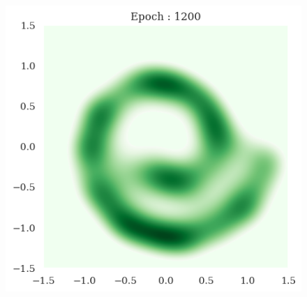 \documentclass[10pt]{article}
\begin{document}
\begin{figure}[!h]
\begin{center}
{            \includegraphics[scale = 0.2]{fig3-3.png}
        }
        \subfigure[]{
}
\end{center}
\end{figure}
\end{document}
